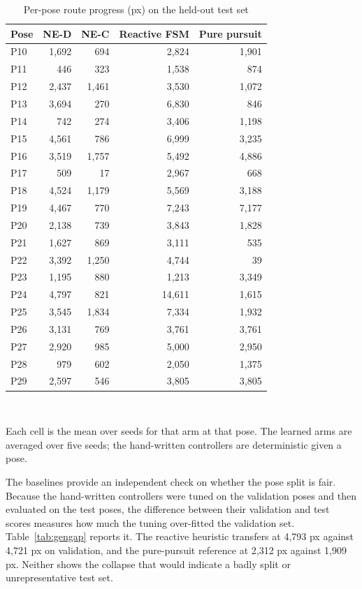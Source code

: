 \documentclass[conference]{IEEEtran}
\begin{document}
\begin{table}[!t]
\caption{Per-pose route progress (px) on the held-out test set}
\label{tab:perpose}
\centering
\footnotesize
\begin{tabular}{lrrrr}
\toprule
Pose & NE-D & NE-C & Reactive FSM & Pure pursuit \\
\midrule
P10 & 1,692 & 694 & 2,824 & 1,901 \\
P11 & 446 & 323 & 1,538 & 874 \\
P12 & 2,437 & 1,461 & 3,530 & 1,072 \\
P13 & 3,694 & 270 & 6,830 & 846 \\
P14 & 742 & 274 & 3,406 & 1,198 \\
P15 & 4,561 & 786 & 6,999 & 3,235 \\
P16 & 3,519 & 1,757 & 5,492 & 4,886 \\
P17 & 509 & 17 & 2,967 & 668 \\
P18 & 4,524 & 1,179 & 5,569 & 3,188 \\
P19 & 4,467 & 770 & 7,243 & 7,177 \\
P20 & 2,138 & 739 & 3,843 & 1,828 \\
P21 & 1,627 & 869 & 3,111 & 535 \\
P22 & 3,392 & 1,250 & 4,744 & 39 \\
P23 & 1,195 & 880 & 1,213 & 3,349 \\
P24 & 4,797 & 821 & 14,611 & 1,615 \\
P25 & 3,545 & 1,834 & 7,334 & 1,932 \\
P26 & 3,131 & 769 & 3,761 & 3,761 \\
P27 & 2,920 & 985 & 5,000 & 2,950 \\
P28 & 979 & 602 & 2,050 & 1,375 \\
P29 & 2,597 & 546 & 3,805 & 3,805 \\
\bottomrule
\end{tabular}
\\[2pt]\parbox{\linewidth}{\scriptsize Each cell is the mean over seeds for that arm at that pose. The learned arms are averaged over five seeds; the hand-written controllers are deterministic given a pose.}
\end{table}

The baselines provide an independent check on whether the pose split is fair. Because the hand-written controllers were tuned on the validation poses and then evaluated on the test poses, the difference between their validation and test scores measures how much the tuning over-fitted the validation set. Table~\ref{tab:gengap} reports it. The reactive heuristic transfers at 4,793 px against 4,721 px on validation, and the pure-pursuit reference at 2,312 px against 1,909 px. Neither shows the collapse that would indicate a badly split or unrepresentative test set.
\end{document}
